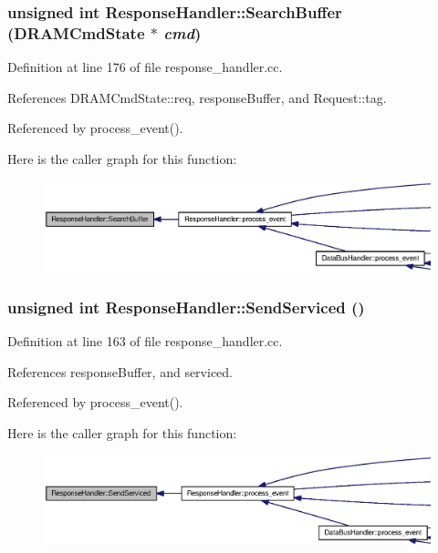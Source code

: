 \subsubsection[{SearchBuffer}]{\setlength{\rightskip}{0pt plus 5cm}unsigned int ResponseHandler::SearchBuffer ({\bf DRAMCmdState} $\ast$ {\em cmd})}\label{classResponseHandler_451d43466f59c461865559e2597040f2}




Definition at line 176 of file response\_\-handler.cc.

References DRAMCmdState::req, responseBuffer, and Request::tag.

Referenced by process\_\-event().

Here is the caller graph for this function:\nopagebreak
\begin{figure}[H]
\begin{center}
\leavevmode
\includegraphics[width=420pt]{classResponseHandler_451d43466f59c461865559e2597040f2_icgraph}
\end{center}
\end{figure}
\subsubsection[{SendServiced}]{\setlength{\rightskip}{0pt plus 5cm}unsigned int ResponseHandler::SendServiced ()}\label{classResponseHandler_936de990ace77188310daec39b4e8d36}




Definition at line 163 of file response\_\-handler.cc.

References responseBuffer, and serviced.

Referenced by process\_\-event().

Here is the caller graph for this function:\nopagebreak
\begin{figure}[H]
\begin{center}
\leavevmode
\includegraphics[width=420pt]{classResponseHandler_936de990ace77188310daec39b4e8d36_icgraph}
\end{center}
\end{figure}
